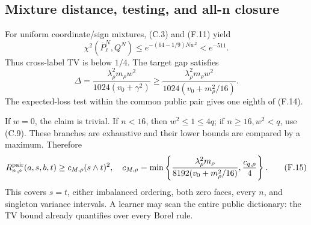 \subsection{Mixture distance, testing, and all-n closure}

For uniform coordinate/sign mixtures, (C.3) and (F.11) yield
\[
 \chi^2(\overline P_\ell^N,Q^N)
 \le e^{-(64-1/9)Nw^2}<e^{-511}.
 \tag{F.13}
\]
Thus cross-label TV is below \(1/4\).  The target gap satisfies
\[
 \Delta=\frac{\lambda_\rho^2m_\rho w^2}
 {1024(v_0+\gamma^2)}
 \ge\frac{\lambda_\rho^2m_\rho w^2}
 {1024(v_0+m_\rho^2/16)}.
 \tag{F.14}
\]
The expected-loss test within the common public pair gives one eighth of
(F.14).

If \(w=0\), the claim is trivial.  If \(n<16\), then
\(w^2\le1\le4q\); if \(n\ge16,w^2<q\), use (C.9).  These branches are
exhaustive and their lower bounds are compared by a maximum.  Therefore
\[
 R^{\mathrm{pair}}_{n,\rho}(a,s,b,t)\ge c_{M,\rho}(s\wedge t)^2,\quad
 c_{M,\rho}=
 \min\left\{\frac{\lambda_\rho^2m_\rho}
 {8192(v_0+m_\rho^2/16)},
             \frac{c_{q,\rho}}4\right\}.
 \tag{F.15}
\]
This covers \(s=t\), either imbalanced ordering, both zero faces, every
\(n\), and singleton variance intervals.  A learner may scan the entire
public dictionary: the TV bound already quantifies over every Borel rule.
